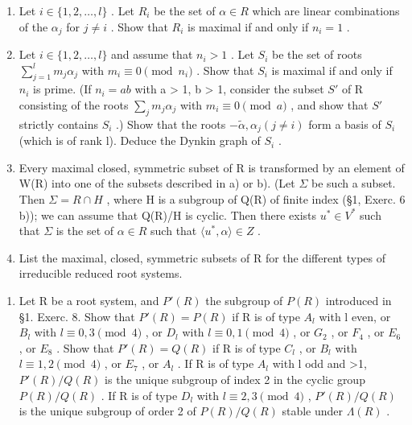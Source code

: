\begin{enumerate}
\def\labelenumi{\alph{enumi})}
\item
  Let \(i \in \{1, 2, \ldots, l\}\) . Let \(R_i\) be the set of \(\alpha \in R\) which are linear combinations of the \(\alpha_j\) for \(j \neq i\) . Show that \(R_i\) is maximal if and only if \(n_i = 1\) .
\item
  Let \(i \in \{1, 2, \ldots, l\}\) and assume that \(n_i > 1\) . Let \(S_i\) be the set of roots \(\sum_{j=1}^{l} m_j \alpha_j\) with \(m_i \equiv 0 \pmod{n_i}\) . Show that \(S_i\) is maximal if and only if \(n_i\) is prime. (If \(n_i = ab\) with a \textgreater{} 1, b \textgreater{} 1, consider the subset \(S'\) of R consisting of the roots \(\sum_{j} m_j \alpha_j\) with \(m_i \equiv 0 \pmod{a}\) , and show that \(S'\) strictly contains \(S_i\) .) Show that the roots \(-\tilde{\alpha}, \alpha_j (j \neq i)\) form a basis of \(S_i\) (which is of rank l). Deduce the Dynkin graph of \(S_i\) .
\item
  Every maximal closed, symmetric subset of R is transformed by an element of W(R) into one of the subsets described in a) or b). (Let \(\Sigma\) be such a subset. Then \(\Sigma = R \cap H\) , where H is a subgroup of Q(R) of finite index (§1, Exerc. 6 b)); we can assume that Q(R)/H is cyclic. Then there exists \(u^{*} \in V^{*}\) such that \(\Sigma\) is the set of \(\alpha \in R\) such that \(\langle u^{*}, \alpha \rangle \in Z\) .
\item
  List the maximal, closed, symmetric subsets of R for the different types of irreducible reduced root systems.
\end{enumerate}

\begin{enumerate}
\def\labelenumi{\arabic{enumi})}
\setcounter{enumi}{4}
\tightlist
\item
  Let R be a root system, and \(P'(R)\) the subgroup of \(P(R)\) introduced in §1. Exerc. 8. Show that \(P'(R) = P(R)\) if R is of type \(A_l\) with l even, or \(B_l\) with \(l \equiv 0,3 \pmod{4}\) , or \(D_l\) with \(l \equiv 0,1 \pmod{4}\) , or \(G_2\) , or \(F_4\) , or \(E_6\) , or \(E_8\) . Show that \(P'(R) = Q(R)\) if R is of type \(C_l\) , or \(B_l\) with \(l \equiv 1,2 \pmod{4}\) , or \(E_7\) , or \(A_l\) . If R is of type \(A_l\) with l odd and \textgreater1, \(P'(R)/Q(R)\) is the unique subgroup of index 2 in the cyclic group \(P(R)/Q(R)\) . If R is of type \(D_l\) with \(l \equiv 2,3 \pmod{4}\) , \(P'(R)/Q(R)\) is the unique subgroup of order 2 of \(P(R)/Q(R)\) stable under \(\Lambda(R)\) .
\end{enumerate}

